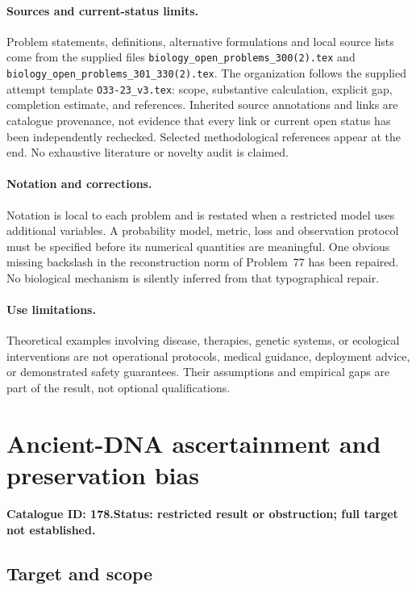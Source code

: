 \documentclass[11pt]{article}
\begin{document}
\paragraph{Sources and current-status limits.}
Problem statements, definitions, alternative formulations and local source lists
come from the supplied files
\texttt{biology\_open\_problems\_300(2).tex} and
\texttt{biology\_open\_problems\_301\_330(2).tex}.
The organization follows the supplied attempt template
\texttt{O33-23\_v3.tex}: scope, substantive calculation, explicit gap,
completion estimate, and references. Inherited source annotations and links are
catalogue provenance, not evidence that every link or current open status has
been independently rechecked. Selected methodological references appear at the
end. No exhaustive literature or novelty audit is claimed.

\paragraph{Notation and corrections.}
Notation is local to each problem and is restated when a restricted model uses
additional variables. A probability model, metric, loss and observation protocol
must be specified before its numerical quantities are meaningful. One obvious
missing backslash in the reconstruction norm of Problem~77 has been repaired.
No biological mechanism is silently inferred from that typographical repair.

\paragraph{Use limitations.}
Theoretical examples involving disease, therapies, genetic systems, or ecological
interventions are not operational protocols, medical guidance, deployment advice,
or demonstrated safety guarantees. Their assumptions and empirical gaps are part
of the result, not optional qualifications.

\setcounter{section}{177}
\section{Ancient-DNA ascertainment and preservation bias}
\label{prob:178}
\noindent\textbf{Catalogue ID: 178.}\quad \textbf{Status: restricted result or obstruction; full target not established.}
\subsection{Target and scope}
\end{document}
